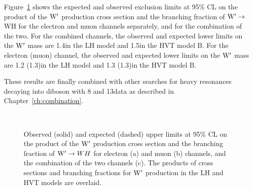 Figure~\ref{fig:limitsFullCLS-WH} shows the expected and observed exclusion limits at 95\% CL on the product of the $\mathrm{W}^\prime$ production cross section and the branching fraction of $\mathrm{W}^\prime\rightarrow$WH for the
electron and muon channels separately, and for the combination of the two. For the combined channels, the observed and expected lower limits on the $\mathrm{W}^\prime$ mass are 1.4\TeV in the LH model and 1.5\TeV in the HVT model B.
For the electron (muon) channel, the observed and expected lower limits on the $\mathrm{W}^\prime$ mass are 1.2 (1.3)\TeV in the LH model and 1.3 (1.3)\TeV in the HVT model B.

These results are finally combined with other searches for heavy resonances decaying into diboson with 8 and 13\TeV data as described in Chapter~\ref{ch:combination}.

 \begin{figure}[!htb]
\centering
{}
\\
\caption{
  Observed (solid) and expected (dashed) upper limits at 95\% CL on the
  product of the $\mathrm{W}^\prime$ production cross section and the branching
  fraction of $\mathrm{W}^\prime\to WH$ for electron (a) and muon (b) channels,
  and the combination of the two channels (c). The products of cross sections and branching fractions for $\mathrm{W}^\prime$ production in the LH and HVT models are overlaid.
}
\label{fig:limitsFullCLS-WH}
\end{figure}